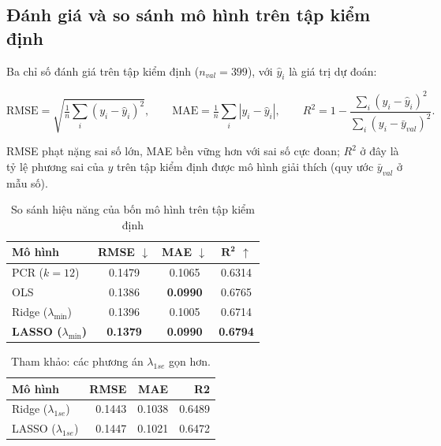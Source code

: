 \subsection{Đánh giá và so sánh mô hình trên tập kiểm
định}\label{ux111uxe1nh-giuxe1-vuxe0-so-suxe1nh-muxf4-huxecnh-truxean-tux1eadp-kiux1ec3m-ux111ux1ecbnh}

Ba chỉ số đánh giá trên tập kiểm định (\(n_{val} = 399\)), với
\(\hat y_i\) là giá trị dự đoán:

\[
\mathrm{RMSE} = \sqrt{\tfrac{1}{n}\textstyle\sum_i (y_i - \hat y_i)^2}, \qquad
\mathrm{MAE} = \tfrac{1}{n}\textstyle\sum_i |y_i - \hat y_i|, \qquad
R^2 = 1 - \frac{\sum_i (y_i - \hat y_i)^2}{\sum_i (y_i - \bar y_{val})^2}.
\]

RMSE phạt nặng sai số lớn, MAE bền vững hơn với sai số cực đoan; \(R^2\)
ở đây là tỷ lệ phương sai của \(y\) trên tập kiểm định được mô hình giải
thích (quy ước \(\bar y_{val}\) ở mẫu số).

\begin{table}[H]
\centering
\caption{So sánh hiệu năng của bốn mô hình trên tập kiểm định}
\label{tab:danh-gia}
\begin{tabular}{lccc}
\toprule
\textbf{Mô hình}
  & \textbf{RMSE} $\downarrow$
  & \textbf{MAE} $\downarrow$
  & $\boldsymbol{R^2}$ $\uparrow$ \\
\midrule
PCR ($k=12$)                & 0.1479          & 0.1065          & 0.6314 \\
OLS                         & 0.1386          & \textbf{0.0990} & 0.6765 \\
Ridge ($\lambda_{\min}$)   & 0.1396          & 0.1005          & 0.6714 \\
\textbf{LASSO ($\lambda_{\min}$)}
                            & \textbf{0.1379} & \textbf{0.0990} & \textbf{0.6794} \\
\bottomrule
\end{tabular}
\end{table}

\begin{longtable}[t]{lrrr}
\caption{\label{tab:danh-gia-1se}Tham khảo: các phương án $\lambda_{1se}$ gọn hơn.}\\
\toprule
Mô hình & RMSE & MAE & R2\\
\midrule
Ridge ($\lambda_{1se}$) & 0.1443 & 0.1038 & 0.6489\\
LASSO ($\lambda_{1se}$) & 0.1447 & 0.1021 & 0.6472\\
\bottomrule
\end{longtable}

